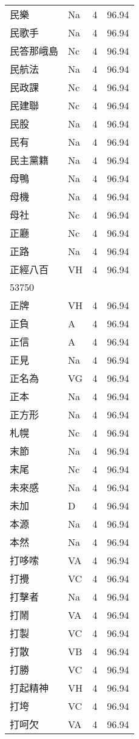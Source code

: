 \documentclass[twocolumn]{book}
\begin{document}
\begin{supertabular}{llrr}
民樂 & Na & 4 &  96.94\\
民歌手 & Na & 4 &  96.94\\
民答那峨島 & Nc & 4 &  96.94\\
民航法 & Na & 4 &  96.94\\
民政課 & Nc & 4 &  96.94\\
民建聯 & Nc & 4 &  96.94\\
民股 & Na & 4 &  96.94\\
民有 & Na & 4 &  96.94\\
民主黨籍 & Na & 4 &  96.94\\
母鴨 & Na & 4 &  96.94\\
母機 & Na & 4 &  96.94\\
母社 & Nc & 4 &  96.94\\
正廳 & Nc & 4 &  96.94\\
正路 & Na & 4 &  96.94\\
正經八百 & VH & 4 &  96.94\\
53750\\
正牌 & VH & 4 &  96.94\\
正負 & A & 4 &  96.94\\
正信 & A & 4 &  96.94\\
正見 & Na & 4 &  96.94\\
正名為 & VG & 4 &  96.94\\
正本 & Na & 4 &  96.94\\
正方形 & Na & 4 &  96.94\\
札幌 & Nc & 4 &  96.94\\
末節 & Na & 4 &  96.94\\
末尾 & Nc & 4 &  96.94\\
未來感 & Na & 4 &  96.94\\
未加 & D & 4 &  96.94\\
本源 & Na & 4 &  96.94\\
本然 & Na & 4 &  96.94\\
打哆嗦 & VA & 4 &  96.94\\
打攪 & VC & 4 &  96.94\\
打擊者 & Na & 4 &  96.94\\
打鬧 & VA & 4 &  96.94\\
打製 & VC & 4 &  96.94\\
打散 & VB & 4 &  96.94\\
打勝 & VC & 4 &  96.94\\
打起精神 & VH & 4 &  96.94\\
打垮 & VC & 4 &  96.94\\
打呵欠 & VA & 4 &  96.94\\

\end{supertabular}
\end{document}
